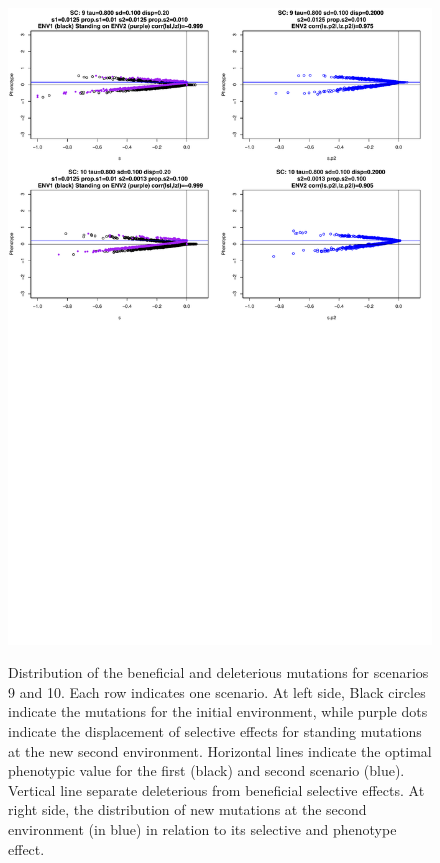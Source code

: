 \documentclass[a4paper,11pt]{article}
\begin{document}
\begin{figure}[h]
{\includegraphics[scale=0.45]{./Dist_ALLScenarios3.pdf}}
\caption{Distribution of the beneficial and deleterious mutations for scenarios 9 and 10. Each row indicates one scenario. At left side, Black circles indicate the mutations for the initial environment, while purple dots indicate the displacement of selective effects for standing mutations at the new second environment. Horizontal lines indicate the optimal phenotypic value for the first (black) and second scenario (blue). Vertical line separate deleterious from beneficial selective effects. At right side, the distribution of new mutations at the second environment (in blue) in relation to its selective and phenotype effect.}
\label{DistALLScenarios3}
\hspace*{-0.5cm}
\end{figure}
\end{document}
